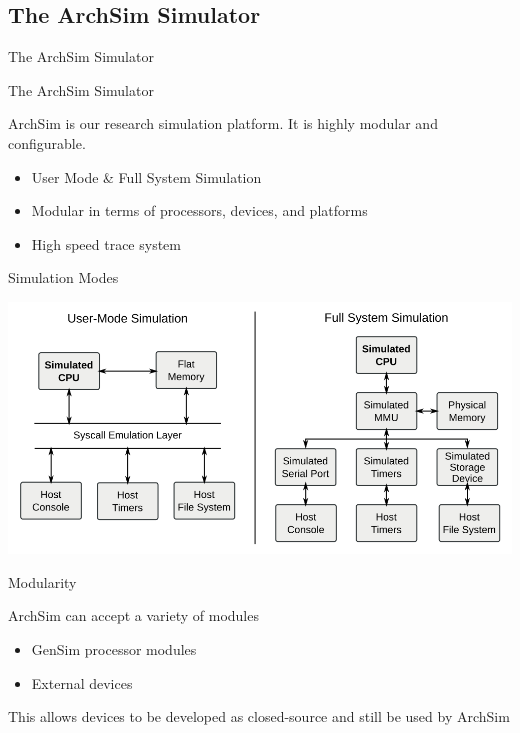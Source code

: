 \subsection{The ArchSim Simulator}

\begin{frame}{The ArchSim Simulator}

\end{frame}

\begin{frame}{The ArchSim Simulator}

ArchSim is our research simulation platform. It is highly modular and configurable.

\begin{itemize}
	\item User Mode \& Full System Simulation
	\item Modular in terms of processors, devices, and platforms
	\item High speed trace system
\end{itemize}

\end{frame}

\begin{frame}{Simulation Modes}

\centering
\includegraphics[width=\textwidth]{figures/user-fullsystem-compare}

\end{frame}

\begin{frame}{Modularity}

ArchSim can accept a variety of modules
\begin{itemize}
	\item GenSim processor modules
	\item External devices
\end{itemize}

This allows devices to be developed as closed-source and still be used
by ArchSim


\end{frame}

